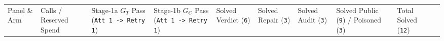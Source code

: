\documentclass[
  11pt,
]{article}
\newcommand{\passthrough}[1]{#1}
\begin{document}
\begingroup\begin{landscape}\small
\begin{longtable}[]{@{}
  >{\raggedright\arraybackslash}p{}
  >{\raggedright\arraybackslash}p{}
  >{\raggedright\arraybackslash}p{}
  >{\raggedright\arraybackslash}p{}
  >{\raggedright\arraybackslash}p{}
  >{\raggedright\arraybackslash}p{}
  >{\raggedright\arraybackslash}p{}
  >{\raggedright\arraybackslash}p{}
  >{\raggedright\arraybackslash}p{}
  >{\raggedright\arraybackslash}p{}@{}}
\toprule\noalign{}
\begin{minipage}[b]{\linewidth}\raggedright
Panel \& Arm
\end{minipage} & \begin{minipage}[b]{\linewidth}\raggedright
Calls / Reserved Spend
\end{minipage} & \begin{minipage}[b]{\linewidth}\raggedright
Stage-1a \(G_T\) Pass (\passthrough{\lstinline!Att 1 -> Retry 1!})
\end{minipage} & \begin{minipage}[b]{\linewidth}\raggedright
Stage-1b \(G_C\) Pass (\passthrough{\lstinline!Att 1 -> Retry 1!})
\end{minipage} & \begin{minipage}[b]{\linewidth}\raggedright
Solved Verdict (\passthrough{\lstinline!6!})
\end{minipage} & \begin{minipage}[b]{\linewidth}\raggedright
Solved Repair (\passthrough{\lstinline!3!})
\end{minipage} & \begin{minipage}[b]{\linewidth}\raggedright
Solved Audit (\passthrough{\lstinline!3!})
\end{minipage} & \begin{minipage}[b]{\linewidth}\raggedright
Solved Public (\passthrough{\lstinline!9!}) / Poisoned
(\passthrough{\lstinline!3!})
\end{minipage} & \begin{minipage}[b]{\linewidth}\raggedright
Total Solved (\passthrough{\lstinline!12!})
\end{minipage} & \begin{minipage}[b]{\linewidth}\raggedright

\end{minipage}
\end{longtable}
\end{landscape}
\end{document}
